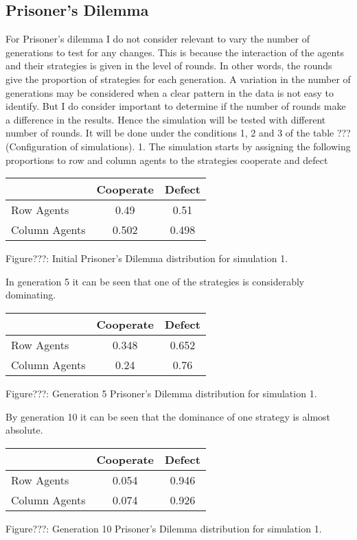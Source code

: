 \documentclass{article}
\begin{document}
\subsection{Prisoner's Dilemma}
For Prisoner's dilemma I do not consider relevant to vary the number of generations to test for any changes. This is because the interaction of the agents and their strategies is given in the level of rounds. In other words, the rounds give the proportion of strategies for each generation. A variation in the number of generations may be considered when a clear pattern in the data is not easy to identify. But I do consider important to determine if the number of rounds make a difference in the results. Hence the simulation will be tested  with different number of rounds. It will be done under the conditions 1, 2 and 3 of the table ???(Configuration of simulations).
1.
The simulation starts by assigning the following proportions to row and column agents to the strategies cooperate and defect
\begin{center}
\begin{tabular}{|l|c|c|}
\hline
& Cooperate & Defect \\ 
\hline
Row Agents & 0.49 & 0.51\\
\hline
Column Agents & 0.502 & 0.498\\
\hline
\end{tabular}
\end{center}
\begin{center}
Figure???: Initial Prisoner’s Dilemma distribution for simulation 1.
\end{center}

In generation 5 it can be seen that one of the strategies is considerably dominating.
\begin{center}
\begin{tabular}{|l|c|c|}
\hline
& Cooperate & Defect \\ 
\hline
Row Agents & 0.348 & 0.652\\
\hline
Column Agents & 0.24 & 0.76\\
\hline
\end{tabular}
\end{center}
\begin{center}
Figure???: Generation 5 Prisoner’s Dilemma distribution for simulation 1.
\end{center}

By generation 10 it can be seen that the dominance of one strategy is almost absolute.

\begin{center}
\begin{tabular}{|l|c|c|}
\hline
& Cooperate & Defect \\ 
\hline
Row Agents & 0.054 & 0.946\\
\hline
Column Agents & 0.074 & 0.926\\
\hline
\end{tabular}
\end{center}
\begin{center}
Figure???: Generation 10 Prisoner’s Dilemma distribution for simulation 1.
\end{center}
\end{document}
